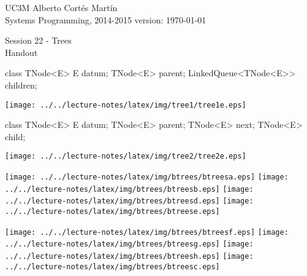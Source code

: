 \documentclass[a4paper, 10pt]{article}
\newcommand{\realtitle}{Session 22 - Trees}
\begin{document}
\footnotesize{
\makebox[\linewidth]{\rule{\textwidth}{0.4pt}}
UC3M \hfill Alberto Cortés Martín\\
Systems Programming, 2014-2015 \hfill version: \today\\
\makebox[\linewidth]{\rule{\textwidth}{0.4pt}}
\begin{center}
  \small{\realtitle}\\Handout
\end{center}
\makebox[\linewidth]{\rule{\textwidth}{0.4pt}}
}
\vspace{0.2cm}

\begin{multicols}{2}
\begin{blackboard}
class TNode<E> {
    E datum;
    TNode<E> parent;
    LinkedQueue<TNode<E>> children;
}
\end{blackboard}
\texttt{[image: ../../lecture-notes/latex/img/tree1/tree1e.eps]}
\columnbreak
\begin{blackboard}
class TNode<E> {
    E datum;
    TNode<E> parent;
    TNode<E> next;
    TNode<E> child;
}
\end{blackboard}
\texttt{[image: ../../lecture-notes/latex/img/tree2/tree2e.eps]}
\end{multicols}




\texttt{[image: ../../lecture-notes/latex/img/btrees/btreesa.eps]}
\texttt{[image: ../../lecture-notes/latex/img/btrees/btreesb.eps]}
\texttt{[image: ../../lecture-notes/latex/img/btrees/btreesd.eps]}
\texttt{[image: ../../lecture-notes/latex/img/btrees/btreese.eps]}

\texttt{[image: ../../lecture-notes/latex/img/btrees/btreesf.eps]}
\texttt{[image: ../../lecture-notes/latex/img/btrees/btreesg.eps]}
\texttt{[image: ../../lecture-notes/latex/img/btrees/btreesh.eps]}
\texttt{[image: ../../lecture-notes/latex/img/btrees/btreesc.eps]}

\newpage
\end{document}

